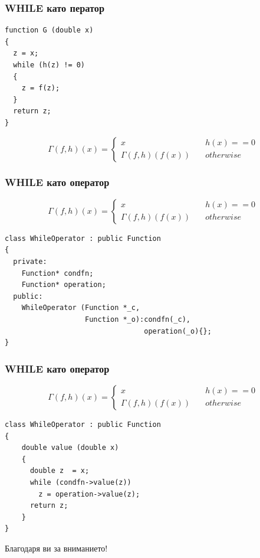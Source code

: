 \documentclass{beamer}
\begin{document}
\begin{frame}[fragile]
\frametitle{WHILE като ператор}

\begin{center}

\begin{lstlisting}
function G (double x)
{
  z = x;
  while (h(z) != 0)
  {
    z = f(z);
  }
  return z;
}
\end{lstlisting}
  
\end{center}


$$
\Gamma(f,h)(x) = \left\{
        \begin{array}{ll}
            x & \quad h(x) == 0 \\
            \Gamma(f,h)(f(x)) & \quad otherwise
        \end{array}
    \right.
$$



\end{frame}


\begin{frame}[fragile]
\frametitle{WHILE като оператор}

\begin{center}
$$
\Gamma(f,h)(x) = \left\{
        \begin{array}{ll}
            x & \quad h(x) == 0 \\
            \Gamma(f,h)(f(x)) & \quad otherwise
        \end{array}
    \right.
$$


\begin{lstlisting}
class WhileOperator : public Function
{
  private:
    Function* condfn;
    Function* operation;
  public:
    WhileOperator (Function *_c, 
                   Function *_o):condfn(_c),
                                 operation(_o){};
}
\end{lstlisting}
  
\end{center}


\end{frame}



\begin{frame}[fragile]
\frametitle{WHILE като оператор}

\begin{center}

$$
\Gamma(f,h)(x) = \left\{
        \begin{array}{ll}
            x & \quad h(x) == 0 \\
            \Gamma(f,h)(f(x)) & \quad otherwise
        \end{array}
    \right.
$$


\begin{lstlisting}
class WhileOperator : public Function
{
    double value (double x)
    {
      double z  = x;
      while (condfn->value(z))
        z = operation->value(z);
      return z;
    }
}
\end{lstlisting}
  
\end{center}


\end{frame}


\begin{frame}
\centerline{Благодаря ви за вниманието!}
\end{frame}
\end{document}
